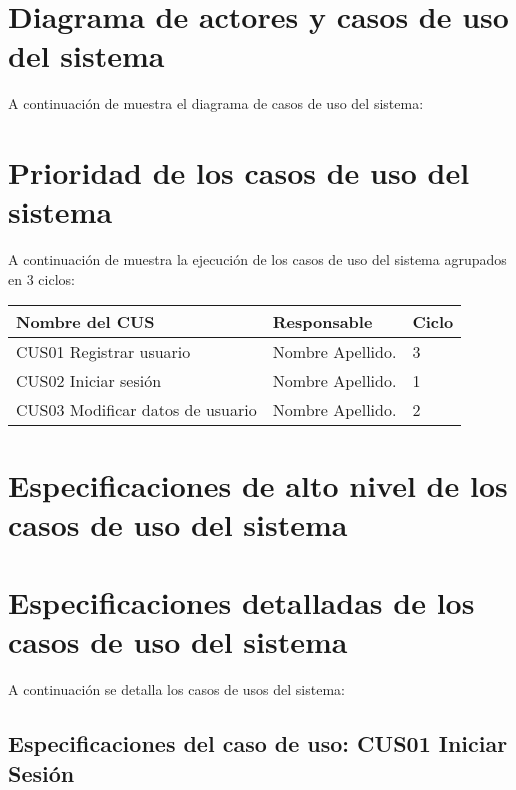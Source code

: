 \section{Diagrama de actores y casos de uso del sistema}

A continuación de muestra el diagrama de casos de uso del sistema:

 
\section{Prioridad de los casos de uso del sistema}

A continuación de muestra la ejecución de los casos de uso del sistema agrupados en 3 ciclos:
	\begin{table}[h!]	
		\begin{tabular}{ |p{4cm}|p{7cm}|p{3cm}| }	\hline
			
			\rowcolor{gray!50}  \textbf{Nombre del CUS}  &  \textbf{Responsable } &  \textbf{Ciclo} \\ \hline
			
			CUS01 Registrar usuario  &  Nombre Apellido. &  3   \\	\hline
			
			CUS02 Iniciar sesión  &  Nombre Apellido. &  1   \\	\hline
		
			CUS03 Modificar datos de usuario  &  Nombre Apellido. &  2   \\	\hline
			
		\end{tabular}
	\end{table}	


\section{Especificaciones de alto nivel de los casos de uso del sistema}

\section{Especificaciones detalladas de los casos de uso del sistema}

A continuación se detalla los casos de usos del sistema:


\subsection{Especificaciones del caso de uso: CUS01 Iniciar Sesión}



